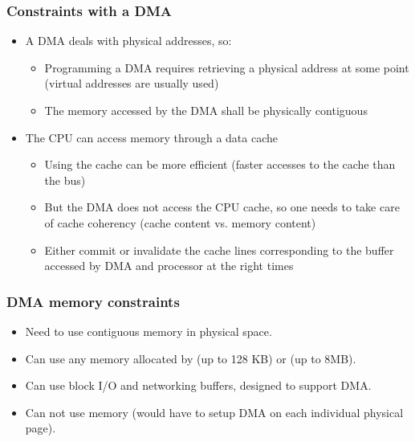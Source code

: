 \begin{frame}
  \frametitle{Constraints with a DMA}
  \begin{itemize}
  \item A DMA deals with physical addresses, so:
    \begin{itemize}
    \item Programming a DMA requires retrieving a physical address at
      some point (virtual addresses are usually used)
    \item The memory accessed by the DMA shall be physically
      contiguous
    \end{itemize}
  \item The CPU can access memory through a data cache
    \begin{itemize}
    \item Using the cache can be more efficient (faster accesses to
      the cache than the bus)
    \item But the DMA does not access the CPU cache, so one needs to
      take care of cache coherency (cache content vs. memory content)
    \item Either commit or invalidate the cache lines corresponding to
      the buffer accessed by DMA and processor at the right times
    \end{itemize}
  \end{itemize}
\end{frame}

\begin{frame}
  \frametitle{DMA memory constraints}
  \begin{itemize}
  \item Need to use contiguous memory in physical space.
  \item Can use any memory allocated by  (up to 128 KB)
    or  (up to 8MB).
  \item Can use block I/O and networking buffers, designed to support
    DMA.
  \item Can not use  memory (would have to setup DMA on each
    individual physical page).
  \end{itemize}
\end{frame}

